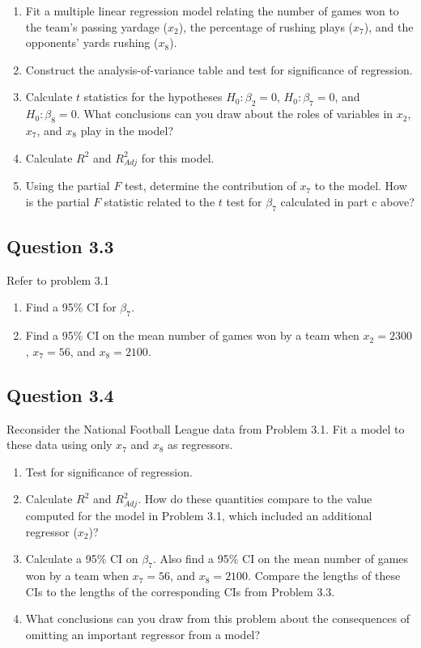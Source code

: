 \documentclass[
  11pt,
]{article}
\providecommand{\tightlist}{%
  \setlength{\itemsep}{0pt}\setlength{\parskip}{0pt}}
\begin{document}
\begin{enumerate}
\def\labelenumi{\alph{enumi}.}
\tightlist
\item
  Fit a multiple linear regression model relating the number of games
  won to the team's passing yardage (\(x_2\)), the percentage of rushing
  plays (\(x_7\)), and the opponents' yards rushing (\(x_8\)).
\item
  Construct the analysis-of-variance table and test for significance of
  regression.
\item
  Calculate \(t\) statistics for the hypotheses \(H_0: \beta_2 = 0\),
  \(H_0: \beta_7 = 0\), and \(H_0: \beta_8 = 0\). What conclusions can
  you draw about the roles of variables in \(x_2\), \(x_7\), and \(x_8\)
  play in the model?
\item
  Calculate \(R^2\) and \(R^2_{Adj}\) for this model.
\item
  Using the partial \(F\) test, determine the contribution of \(x_7\) to
  the model. How is the partial \(F\) statistic related to the \(t\)
  test for \(\beta_7\) calculated in part c above?
\end{enumerate}

\subsection{Question 3.3}\label{question-3.3}

Refer to problem 3.1

\begin{enumerate}[label=\alph*.]
  \item Find a 95\% CI for $\beta_7$. 
  \item Find a 95\% CI on the mean number of games won by a team when $x_2 = 2300$, $x_7 = 56$, and $x_8 = 2100$.
\end{enumerate}

\subsection{Question 3.4}\label{question-3.4}

Reconsider the National Football League data from Problem 3.1. Fit a
model to these data using only \(x_7\) and \(x_8\) as regressors.

\begin{enumerate}[label=\alph*.]
  \item Test for significance of regression.
  \item Calculate $R^2$ and $R^2_{Adj}$. How do these quantities compare to the value computed for the model in Problem 3.1, which included an additional regressor ($x_2$)?
  \item Calculate a 95\% CI on $\beta_7$. Also find a 95\% CI on the mean number of games won by a team when $x_7 = 56$, and $x_8 = 2100$. Compare the lengths of these CIs to the lengths of the corresponding CIs from Problem 3.3.
  \item What conclusions can you draw from this problem about the consequences of omitting an important regressor from a model?
\end{enumerate}
\end{document}
